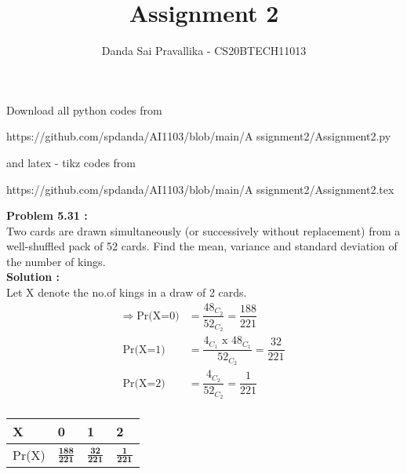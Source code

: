 \documentclass[journal,12pt,twocolumn]{IEEEtran}
\title{Assignment 2}
\author{Danda Sai Pravallika  - CS20BTECH11013}
\begin{document}
\maketitle
Download all python codes from
\begin{tcolorbox}
https://github.com/spdanda/AI1103/blob/main/A
ssignment2/Assignment2.py
\end{tcolorbox}
and latex - tikz codes from 
\begin{tcolorbox}
https://github.com/spdanda/AI1103/blob/main/A
ssignment2/Assignment2.tex
\end{tcolorbox}
\large\textbf{Problem 5.31 :}\\
Two cards are drawn simultaneously (or successively without replacement) from a well-shuffled  pack  of  52  cards.  Find  the  mean, variance and standard deviation of the number of kings.\\
\textbf{Solution :}\\
Let X denote the no.of kings in a draw of 2 cards.
\begin{align*}
\Longrightarrow\; \text{Pr(X=0)} &= \dfrac{48_{C_2}}{52_{C_2}}=\dfrac{188}{221} \\
\text{Pr(X=1)} &= \dfrac{4_{C_1}\text{ x }48_{C_1}}{52_{C_2}}=\dfrac{32}{221} \\ 
\text{Pr(X=2)}&=\dfrac{4_{C_2}}{52_{C_2}}= \dfrac{1}{221}\\
\end{align*}
\vspace*{-2cm}
\begin{center}
\begin{tabular}{ | m{1.2cm} | m{1.5cm}| m{1.5cm} | m{1.5cm} | } 
\hline \vspace{2pt}

\large X     & \hspace{0.5cm}0                & \hspace{0.5cm}1               & \hspace{0.5cm}2             \\ \hline \vspace{6pt}
\large Pr(X) & \hspace{0.5cm}\(\frac{\textbf{188}}{\textbf{221}}\) & \hspace{0.5cm}\(\frac{\textbf{32}}{\textbf{221}}\) & \;\;\;\(\frac{\textbf{1}}{\textbf{221}}\)\\ 
\hline
\end{tabular}
\end{center}
\vspace{0.3cm}
\end{document}
